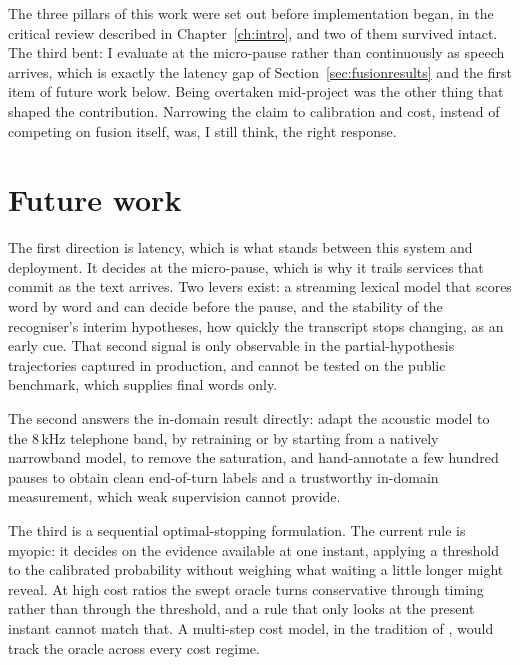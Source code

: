 The three pillars of this work were set out before implementation began, in the critical
review described in Chapter~\ref{ch:intro}, and two of them survived intact. The third
bent: I evaluate at the micro-pause rather than continuously as speech arrives, which is
exactly the latency gap of Section~\ref{sec:fusionresults} and the first item of future
work below. Being overtaken mid-project was the other thing that shaped the contribution. Narrowing the
claim to calibration and cost, instead of competing on fusion itself, was, I still think,
the right response.

\section{Future work}

The first direction is latency, which is what stands between this system and deployment. It
decides at the micro-pause, which is why it trails services that commit as the text arrives.
Two levers exist: a streaming lexical model that scores word by word and can decide before
the pause, and the stability of the recogniser's interim hypotheses, how quickly the
transcript stops changing, as an early cue. That second signal is only observable in the
partial-hypothesis trajectories captured in production, and cannot be tested on the public
benchmark, which supplies final words only.

The second answers the in-domain result directly: adapt the acoustic model to the 8\,kHz
telephone band, by retraining or by starting from a natively narrowband model, to remove the
saturation, and hand-annotate a few hundred pauses to obtain clean end-of-turn labels and a
trustworthy in-domain measurement, which weak supervision cannot provide.

The third is a sequential optimal-stopping formulation. The current rule is myopic: it
decides on the evidence available at one instant, applying a threshold to the calibrated
probability without weighing what waiting a little longer might reveal. At high cost ratios the swept oracle turns
conservative through timing rather than through the threshold, and a rule that only looks at the present instant cannot match that. A multi-step cost model, in the tradition of \citet{wald1945sequential}, would
track the oracle across every cost regime.
